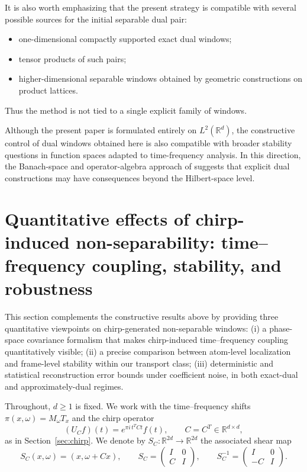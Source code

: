 \documentclass[final,1p,times,authoryear]{elsarticle}
\theoremstyle{definition}
\newcommand{\R}{\mathbb{R}}
\newcommand{\1}{\mathbf{1}}
\begin{document}
It is also worth emphasizing that the present strategy is compatible with several possible sources for the
initial separable dual pair:
\begin{itemize}
    \item one-dimensional compactly supported exact dual windows;
    \item tensor products of such pairs;
    \item higher-dimensional separable windows obtained by geometric constructions on product lattices.
\end{itemize}
Thus the method is not tied to a single explicit family of windows.


Although the present paper is formulated entirely on $L^2(\R^d)$, the constructive control of dual windows obtained here is also compatible with broader stability questions in function spaces adapted to time-frequency analysis. In this direction, the Banach-space and operator-algebra approach of \citep{BCKOR13} suggests that explicit dual constructions may have consequences beyond the Hilbert-space level.


\section{Quantitative effects of chirp-induced non-separability:
time--frequency coupling, stability, and robustness}\label{sec:quantitative}

This section complements the constructive results above by providing three quantitative
viewpoints on chirp-generated non-separable windows:
{(i) a phase-space covariance formalism that makes chirp-induced time--frequency coupling
quantitatively visible;}
(ii) a precise comparison between atom-level localization and frame-level stability within
our transport class;
(iii) deterministic and statistical reconstruction error bounds under coefficient noise,
in both exact-dual and approximately-dual regimes.

Throughout, $d\ge 1$ is fixed. We work with the time--frequency shifts
$\pi(x,\omega)=M_\omega T_x$ and the chirp operator
$$
(U_C f)(t)=e^{\pi i\, t^T C t}f(t),
\qquad C=C^T\in\R^{d\times d},
$$
as in Section~\ref{sec:chirp}.
We denote by $S_C:\R^{2d}\to\R^{2d}$ the associated shear map
$$
S_C(x,\omega)=(x,\omega+Cx),
\qquad
S_C=\begin{pmatrix}I&0\\ C&I\end{pmatrix},
\qquad
S_C^{-1}=\begin{pmatrix}I&0\\ -C&I\end{pmatrix}.
$$
\end{document}
